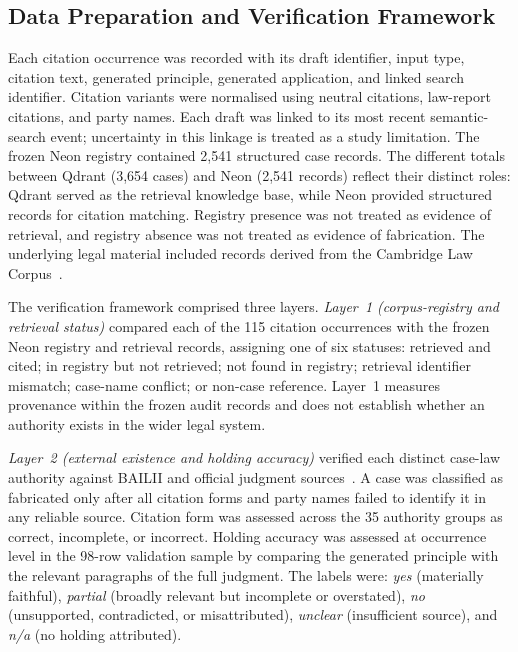 \documentclass[conference]{IEEEtran}
\begin{document}
\subsection{Data Preparation and Verification Framework}

Each citation occurrence was recorded with its draft identifier, input type, citation text, generated principle, generated application, and linked search identifier. Citation variants were normalised using neutral citations, law-report citations, and party names. Each draft was linked to its most recent semantic-search event; uncertainty in this linkage is treated as a study limitation. The frozen Neon registry contained 2{,}541 structured case records. The different totals between Qdrant (3{,}654 cases) and Neon (2{,}541 records) reflect their distinct roles: Qdrant served as the retrieval knowledge base, while Neon provided structured records for citation matching. Registry presence was not treated as evidence of retrieval, and registry absence was not treated as evidence of fabrication. The underlying legal material included records derived from the Cambridge Law Corpus~\cite{cambridge2023}.

The verification framework comprised three layers. \textit{Layer~1 (corpus-registry and retrieval status)} compared each of the 115 citation occurrences with the frozen Neon registry and retrieval records, assigning one of six statuses: retrieved and cited; in registry but not retrieved; not found in registry; retrieval identifier mismatch; case-name conflict; or non-case reference. Layer~1 measures provenance within the frozen audit records and does not establish whether an authority exists in the wider legal system.

\textit{Layer~2 (external existence and holding accuracy)} verified each distinct case-law authority against BAILII and official judgment sources~\cite{bailii}. A case was classified as fabricated only after all citation forms and party names failed to identify it in any reliable source. Citation form was assessed across the 35 authority groups as correct, incomplete, or incorrect. Holding accuracy was assessed at occurrence level in the 98-row validation sample by comparing the generated principle with the relevant paragraphs of the full judgment. The labels were: \textit{yes} (materially faithful), \textit{partial} (broadly relevant but incomplete or overstated), \textit{no} (unsupported, contradicted, or misattributed), \textit{unclear} (insufficient source), and \textit{n/a} (no holding attributed).
\end{document}
